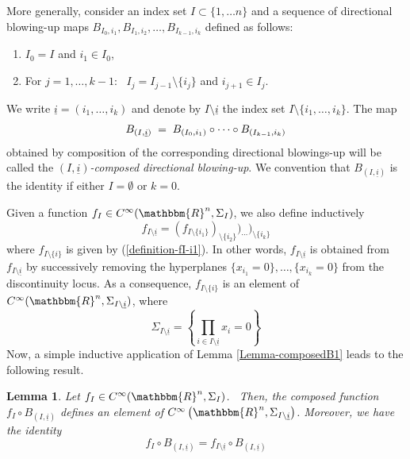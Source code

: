 \documentclass[11pt,psamsfonts]{article}
\newcommand{\tmem}[1]{{\em #1\/}}
\newtheorem{Lemma}[Theorem]{Lemma}
\theoremstyle{definition}
\theoremstyle{remark}
\newcommand{\cR}{\ensuremath{\mathbbm{R}}}
\begin{document}
More generally, consider an index set $I \subset \{ 1, \ldots n \}$ and a
sequence of directional blowing-up maps $B_{I_0, i_1}, B_{I_1, i_2}, \ldots,
B_{I_{k - 1}, i_k}$ defined as follows:
\begin{enumerate}
  \item $I_0 = I$ and $i_1 \in I_0$,
  \item For $j = 1, \ldots, k - 1$: \ $I_j = I_{j - 1} \setminus \{ i_j \}$
  and $i_{j + 1} \in I_j$.
\end{enumerate}
We write $\underline{i} = (i_1, \ldots, i_k)$ and denote by $I \setminus
\underline{i}$ the index set $I \setminus \{i_1, \ldots, i_k \}$. The map
\begin{equation}
  B_{\left( I, \underline{i} \right)} \hspace{0.27em} = \hspace{0.27em}
  B_{(I_0, i_1)} \circ \cdots \circ B_{(I_{k - 1}, i_k)}
  \label{composed-blowupdef}
\end{equation}
obtained by composition of the corresponding directional blowings-up will be called the {\tmem{$\left( I, \underline{i} \right)$-composed directional
blowing-up}}. We convention that $B_{\left( I, \underline{i} \right)}$ is the
identity if either $I = \emptyset$ or $k = 0$.

Given a function $f_I \in C^{\infty} (\cR^n, \Sigma_I)$, we also define inductively
$$
f_{I \setminus
     \underline{i}} = (f_{I\setminus \{i_1\}})_{\setminus \{i_2\}})_{\cdots})_{\setminus \{i_k\}}
$$
where $f_{I\setminus \{i\}}$ is given by (\ref{definition-fI-i1}). In other words, $f_{I \setminus
     \underline{i}}$ is obtained from $f_{I \setminus
     \underline{i}}$ by successively removing the hyperplanes $\{x_{i_1}=0\},\ldots,\{x_{i_k}=0\}$ from the discontinuity locus. As a consequence, 
     $f_{I\setminus \{i\}}$ is an element of $C^\infty(\cR^n,\Sigma_{I\setminus \underline{i}})$, where 
$$
\Sigma_{I\setminus \underline{i}} = \left\{ \prod_{i \in I\setminus \underline{i}} x_i = 0 \right\}
$$
Now, a simple inductive application of Lemma \ref{Lemma-composedB1} leads to the
following result.
\begin{Lemma}
  \label{Lemma-composedB}Let $f_I \in C^{\infty} (\cR^n, \Sigma_I)$. \
  Then, the composed function $f_I \circ B_{\left( I, \underline{i} \right)}$
  defines an element of $C^{\infty} \left( \cR^n, \Sigma_{I \setminus
  \underline{i}} \right)$. Moreover, we have the identity
  \[ f_I \circ B_{\left( I, \underline{i} \right)} = f_{I \setminus
     \underline{i}} \circ B_{\left( I, \underline{i} \right)} \]
\end{Lemma}
\end{document}
